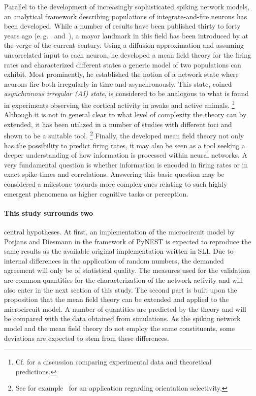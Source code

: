 Parallel to the development of increasingly sophisticated spiking network models, 
an analytical framework describing populations of integrate-and-fire neurons has 
been developed. While a number of results have been published thirty to forty years ago
(e.\,g.~ and~), a mayor landmark
in this field has been introduced by  at the verge of the current century.
Using a diffusion approximation and assuming uncorrelated input to each neuron, he
developed a mean field theory for the firing rates and characterized different states
a generic model of two populations can exhibit. Most prominently, he established the 
notion of a network state where neurons fire both irregularly in time and asynchronously. 
This state, coined \textit{asynchronous irregular (AI) state}, is considered to be 
analogous to what is found in experiments observing the cortical activity in awake and 
active animals.%
\footnote{Cf.  for a discussion comparing 
experimental data and theoretical predictions.}
Although it is not in general clear to what level of complexity the theory can by extended, 
it has been utilized in a number of studies with different 
foci and shown to be a suitable tool.%
\footnote{
    See for example~ for an application 
    regarding orientation selectivity.
} Finally, the developed mean field theory not only has the possibility to predict 
firing rates, it may also be seen as a tool seeking a deeper understanding of 
how information is processed within neural networks. A very fundamental
question is whether information is encoded in firing rates 
or in exact spike times and correlations. Answering this basic question may be considered
a milestone  towards more complex ones relating to such
highly emergent phenomena as higher cognitive tasks or perception. 

\paragraph{This study surrounds two}
central hypotheses. At first, an implementation of the microcircuit model by
Potjans and Diesmann in the framework of PyNEST is expected to reproduce the 
same results as the available original implementation written in SLI. Due to
internal differences in the application of random numbers, the demanded agreement 
will only be of statistical quality. The measures used for the validation 
are common quantities for the characterization of the network 
activity and will also enter in the next section of this study. 
The second part is built upon the proposition that the mean field theory 
can be extended and applied to the microcircuit model. 
A number of quantities are predicted by the theory and will 
be compared with the data obtained from simulations. As the spiking network model 
and the mean field theory do not employ the same constituents, some 
deviations are expected to stem from these differences. 

